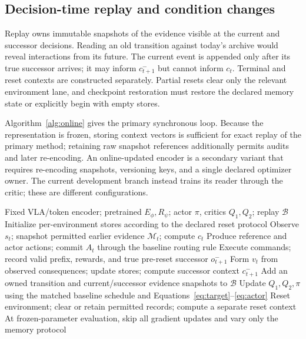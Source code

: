 \documentclass[10pt,letterpaper]{article}
\newcommand{\M}{\mathcal{M}}
\begin{document}
\subsection{Decision-time replay and condition changes}
Replay owns immutable snapshots of the evidence visible at the current and successor decisions. Reading an old transition against today's archive would reveal interactions from its future. The current event is appended only after its true successor arrives; it may inform $c_{t+1}^{-}$ but cannot inform $c_t$. Terminal and reset contexts are constructed separately. Partial resets clear only the relevant environment lane, and checkpoint restoration must restore the declared memory state or explicitly begin with empty stores.

Algorithm~\ref{alg:online} gives the primary synchronous loop. Because the representation is frozen, storing context vectors is sufficient for exact replay of the primary method; retaining raw snapshot references additionally permits audits and later re-encoding. An online-updated encoder is a secondary variant that requires re-encoding snapshots, versioning keys, and a single declared optimizer owner. The current development branch instead trains its reader through the critic; these are different configurations.

\begin{algorithm}[t]
\caption{IM-RLT online learning with a fixed context representation (proposed)}
\label{alg:online}
\begin{algorithmic}[1]
\Require Fixed VLA/token encoder; pretrained $E_\phi,R_\psi$; actor $\pi$, critics $Q_1,Q_2$; replay $\mathcal B$
\State Initialize per-environment stores according to the declared reset protocol
  \State Observe $s_t$; snapshot permitted earlier evidence $\M_t$; compute $c_t$
  \State Produce reference and actor actions; commit $A_t$ through the baseline routing rule
  \State Execute commands; record valid prefix, rewards, and true pre-reset successor $o_{t+1}^{-}$
  \State Form $v_t$ from observed consequences; update stores; compute successor context $c_{t+1}^{-}$
  \State Add an owned transition and current/successor evidence snapshots to $\mathcal B$
  \State Update $Q_1,Q_2,\pi$ using the matched baseline schedule and Equations~\ref{eq:target}--\ref{eq:actor}
    \State Reset environment; clear or retain permitted records; compute a separate reset context
  \EndIf
\EndFor
\State At frozen-parameter evaluation, skip all gradient updates and vary only the memory protocol
\end{algorithmic}
\end{algorithm}
\end{document}
